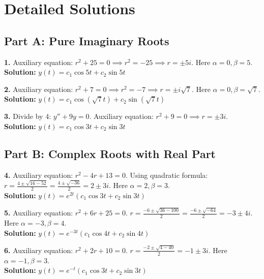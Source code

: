 \documentclass[11pt]{article}
\begin{document}
\newpage

\section{Detailed Solutions}

\subsection*{Part A: Pure Imaginary Roots}
\textbf{1.} Auxiliary equation: $r^2 + 25 = 0 \implies r^2 = -25 \implies r = \pm 5i$. Here $\alpha=0, \beta=5$. \\
\textbf{Solution:} $y(t) = c_1 \cos 5t + c_2 \sin 5t$

\vspace{0.5cm}
\noindent\textbf{2.} Auxiliary equation: $r^2 + 7 = 0 \implies r^2 = -7 \implies r = \pm i\sqrt{7}$. Here $\alpha=0, \beta=\sqrt{7}$. \\
\textbf{Solution:} $y(t) = c_1 \cos(\sqrt{7}t) + c_2 \sin(\sqrt{7}t)$

\vspace{0.5cm}
\noindent\textbf{3.} Divide by 4: $y'' + 9y = 0$. Auxiliary equation: $r^2 + 9 = 0 \implies r = \pm 3i$. \\
\textbf{Solution:} $y(t) = c_1 \cos 3t + c_2 \sin 3t$

\subsection*{Part B: Complex Roots with Real Part}
\textbf{4.} Auxiliary equation: $r^2 - 4r + 13 = 0$. Using quadratic formula: $r = \frac{4 \pm \sqrt{16 - 52}}{2} = \frac{4 \pm \sqrt{-36}}{2} = 2 \pm 3i$. Here $\alpha=2, \beta=3$. \\
\textbf{Solution:} $y(t) = e^{2t}(c_1 \cos 3t + c_2 \sin 3t)$

\vspace{0.5cm}
\noindent\textbf{5.} Auxiliary equation: $r^2 + 6r + 25 = 0$. $r = \frac{-6 \pm \sqrt{36 - 100}}{2} = \frac{-6 \pm \sqrt{-64}}{2} = -3 \pm 4i$. Here $\alpha=-3, \beta=4$. \\
\textbf{Solution:} $y(t) = e^{-3t}(c_1 \cos 4t + c_2 \sin 4t)$

\vspace{0.5cm}
\noindent\textbf{6.} Auxiliary equation: $r^2 + 2r + 10 = 0$. $r = \frac{-2 \pm \sqrt{4 - 40}}{2} = -1 \pm 3i$. Here $\alpha=-1, \beta=3$. \\
\textbf{Solution:} $y(t) = e^{-t}(c_1 \cos 3t + c_2 \sin 3t)$
\end{document}
